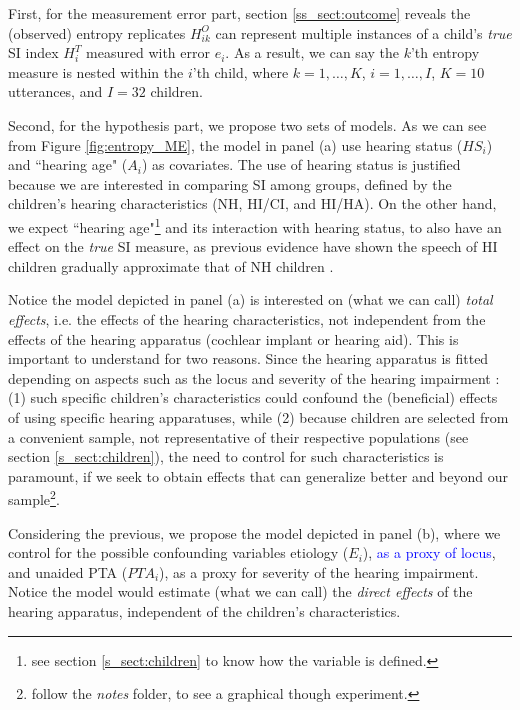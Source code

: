First, for the measurement error part, section \ref{ss_sect:outcome} reveals the (observed) entropy replicates $H^{O}_{ik}$ can represent multiple instances of a child's \textit{true} SI index $H^{T}_{i}$ measured with error $e_i$. As a result, we can say the $k$'th entropy measure is nested within the $i$'th child, where $k=1, \dots, K$, $i=1, \dots, I$, $K = 10$ utterances, and $I = 32$ children.

Second, for the hypothesis part, we propose two sets of models. As we can see from Figure \ref{fig:entropy_ME}, the model in panel (a) use hearing status ($HS_{i}$) and ``hearing age" ($A_{i}$) as covariates. The use of hearing status is justified because we are interested in comparing SI among groups, defined by the children's hearing characteristics (NH, HI/CI, and HI/HA). On the other hand, we expect ``hearing age"\footnote{see section \ref{s_sect:children} to know how the variable is defined.} and its interaction with hearing status, to also have an effect on the \textit{true} SI measure, as previous evidence have shown the speech of HI children gradually approximate that of NH children \citep{Boonen_et_al_2019}.

Notice the model depicted in panel (a) is interested on (what we can call) \textit{total effects}, i.e. the effects of the hearing characteristics, not independent from the effects of the hearing apparatus (cochlear implant or hearing aid). This is important to understand for two reasons. Since the hearing apparatus is fitted depending on aspects such as the locus and severity of the hearing impairment \citep{Korver_et_al_2017}: (1) such specific children's characteristics could confound the (beneficial) effects of using specific hearing apparatuses, while (2) because children are selected from a convenient sample, not representative of their respective populations (see section \ref{s_sect:children}), the need to control for such characteristics is paramount, if we seek to obtain effects that can generalize better and beyond our sample\footnote{follow the \textit{notes} folder, to see a graphical though experiment.}.

Considering the previous, we propose the model depicted in panel (b), where we control for the possible confounding variables etiology ($E_{i}$), \textcolor{blue}{as a proxy of locus}, and unaided PTA ($PTA_{i}$), as a proxy for severity of the hearing impairment. Notice the model would estimate (what we can call) the \textit{direct effects} of the hearing apparatus, independent of the children's characteristics.

